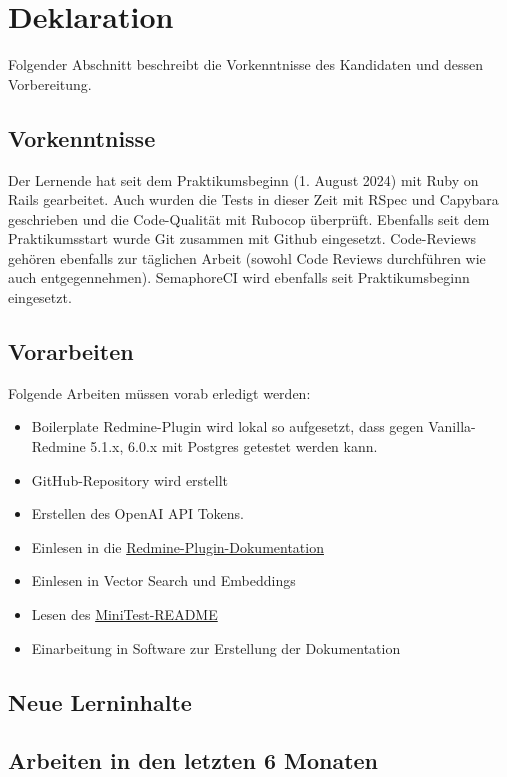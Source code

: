 \chapter{Deklaration}

Folgender Abschnitt beschreibt die Vorkenntnisse des Kandidaten und dessen Vorbereitung.

\section{Vorkenntnisse}

Der Lernende hat seit dem Praktikumsbeginn (1. August 2024) mit Ruby on Rails gearbeitet. Auch wurden die Tests in dieser Zeit mit RSpec und Capybara geschrieben und die Code-Qualität mit Rubocop überprüft. Ebenfalls seit dem Praktikumsstart wurde Git zusammen mit Github eingesetzt. Code-Reviews gehören ebenfalls zur täglichen Arbeit (sowohl Code Reviews durchführen wie auch entgegennehmen). SemaphoreCI wird ebenfalls seit Praktikumsbeginn eingesetzt.

\section{Vorarbeiten}

Folgende Arbeiten müssen vorab erledigt werden:

\begin{itemize}
  \item[\checkmark] Boilerplate Redmine-Plugin wird lokal so aufgesetzt, dass gegen Vanilla-Redmine 5.1.x, 6.0.x mit Postgres getestet werden kann.
  \item[\checkmark] GitHub-Repository wird erstellt
  \item[\checkmark] Erstellen des OpenAI API Tokens.
  \item[\checkmark] Einlesen in die \href{https://www.redmine.org/boards/4/topics/45309}{Redmine-Plugin-Dokumentation}
  \item[\checkmark] Einlesen in Vector Search und Embeddings
  \item[\checkmark] Lesen des \href{https://github.com/minitest/minitest}{MiniTest-README}
  \item[\checkmark] Einarbeitung in Software zur Erstellung der Dokumentation
\end{itemize}

\section{Neue Lerninhalte}

\lipsum[13]

\section{Arbeiten in den letzten 6 Monaten}

\lipsum[14]
